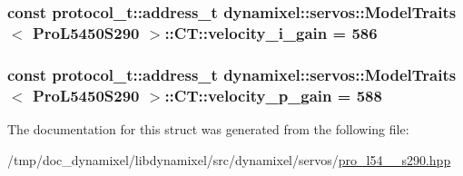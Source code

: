 \subsubsection[{velocity\+\_\+i\+\_\+gain}]{\setlength{\rightskip}{0pt plus 5cm}const {\bf protocol\+\_\+t\+::address\+\_\+t} {\bf dynamixel\+::servos\+::\+Model\+Traits}$<$ {\bf Pro\+L5450\+S290} $>$\+::C\+T\+::velocity\+\_\+i\+\_\+gain = 586\hspace{0.3cm}{\ttfamily [static]}}\label{structdynamixel_1_1servos_1_1_model_traits_3_01_pro_l5450_s290_01_4_1_1_c_t_a25505dd9b6e78c997b33a171b59055e6}
\hypertarget{structdynamixel_1_1servos_1_1_model_traits_3_01_pro_l5450_s290_01_4_1_1_c_t_a397e497629a2a76198ea90324d45713f}{}
\subsubsection[{velocity\+\_\+p\+\_\+gain}]{\setlength{\rightskip}{0pt plus 5cm}const {\bf protocol\+\_\+t\+::address\+\_\+t} {\bf dynamixel\+::servos\+::\+Model\+Traits}$<$ {\bf Pro\+L5450\+S290} $>$\+::C\+T\+::velocity\+\_\+p\+\_\+gain = 588\hspace{0.3cm}{\ttfamily [static]}}\label{structdynamixel_1_1servos_1_1_model_traits_3_01_pro_l5450_s290_01_4_1_1_c_t_a397e497629a2a76198ea90324d45713f}


The documentation for this struct was generated from the following file\+:\begin{DoxyCompactItemize}
\item 
/tmp/doc\+\_\+dynamixel/libdynamixel/src/dynamixel/servos/\hyperlink{pro__l54__50__s290_8hpp}{pro\+\_\+l54\+\_\+\_\+s290.\+hpp}\end{DoxyCompactItemize}
